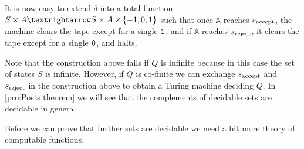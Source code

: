 \begin{exam}
  It is now easy to extend \(δ\) into a total function \(S \times A → S \times A
  \times \set{-1, 0, 1}\) such that once \(\mathbb{A}\) reaches
  \(s_{\text{accept}}\), the machine clears the tape except for a single \(\mathtt{1}\),
  and if  \(\mathbb{A}\) reaches \(s_{\text{reject}}\), it clears the tape except
  for a single \(\mathtt{0}\), and halts.
\end{exam}

Note that the construction above fails if \(Q\) is infinite because in this case
the set of states \(S\) is infinite. However, if \(Q\) is co-finite we can
exchange \(s_{\text{accept}}\) and \(s_{\text{reject}}\) in the construction above to
obtain a Turing machine deciding \(Q\). In \cref{pro:Posts theorem} we will see
that the complements of decidable sets are decidable in general.

Before we can prove that further sets are decidable we need a bit more theory of
computable functions.

